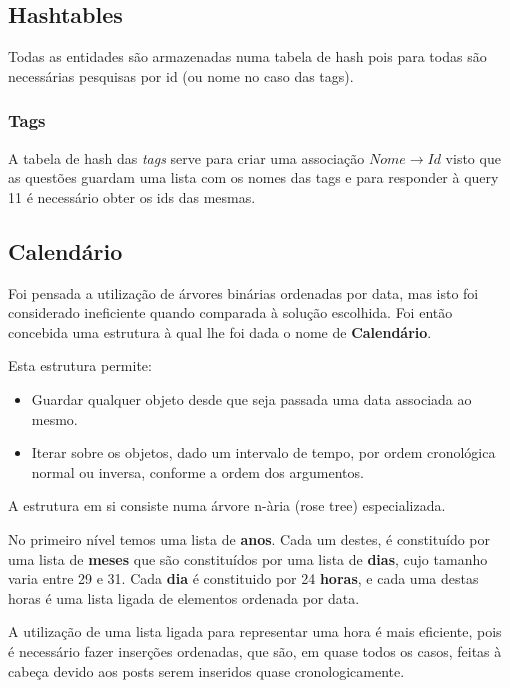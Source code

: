 \documentclass[10pt,a4paper]{article}
\begin{document}
    \subsection{Hashtables}
        Todas as entidades são armazenadas numa tabela de hash pois para todas
        são necessárias pesquisas por id (ou nome no caso das tags).

        \subsubsection{Tags}
        A tabela de hash das \textit{tags} serve para criar uma associação
        $Nome \to Id$ visto que as questões guardam uma lista com os nomes das
        tags e para responder à query 11 é necessário obter os ids das mesmas.

    \subsection{Calendário}
        Foi pensada a utilização de árvores binárias ordenadas por data,
        mas isto foi considerado ineficiente quando comparada à solução
        escolhida. Foi então concebida uma estrutura à qual lhe foi dada o nome
        de \textbf{Calendário}.

        Esta estrutura permite:
        \begin{itemize}
                \item Guardar qualquer objeto desde que seja
                      passada uma data associada ao mesmo.
                \item Iterar sobre os objetos, dado um intervalo de tempo,
                      por ordem cronológica normal ou inversa, conforme a
                      ordem dos argumentos.
        \end{itemize}

        A estrutura em si consiste numa árvore n-ària (rose tree) especializada.

        No primeiro nível temos uma lista de \textbf{anos}. Cada um destes,
        é constituído por uma lista de \textbf{meses} que são constituídos por
        uma lista de \textbf{dias}, cujo tamanho varia entre 29 e 31. Cada
        \textbf{dia} é constituido por 24 \textbf{horas}, e cada uma destas horas
        é uma lista ligada de elementos ordenada por data.

        

        A utilização de uma lista ligada para representar uma hora é mais
        eficiente, pois é necessário fazer inserções ordenadas, que são, em quase
        todos os casos, feitas à cabeça devido aos posts serem inseridos quase
        cronologicamente.
\end{document}
